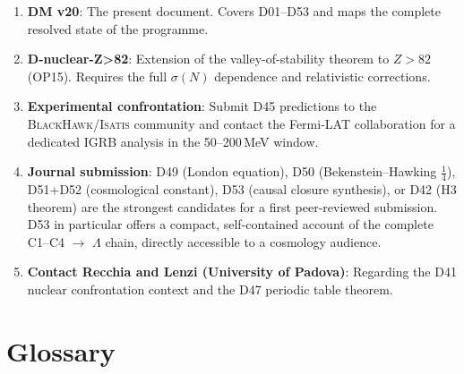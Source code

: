 \documentclass[11pt,a4paper]{article}
\theoremstyle{plain}
\theoremstyle{definition}
\theoremstyle{remark}
\newcommand{\sigmaN}{\sigma(N)}
\begin{document}
\begin{enumerate}
\item \textbf{DM v20}: The present document. Covers D01--D53 and maps the complete resolved state of the programme.
\item \textbf{D-nuclear-Z>82}: Extension of the valley-of-stability theorem to $Z>82$ (OP15). Requires the full $\sigmaN$ dependence and relativistic corrections.
\item \textbf{Experimental confrontation}: Submit D45 predictions to the \textsc{BlackHawk}/\textsc{Isatis} community and contact the Fermi-LAT collaboration for a dedicated IGRB analysis in the 50--200\,MeV window.
\item \textbf{Journal submission}: D49 (London equation), D50 (Bekenstein--Hawking $\tfrac{1}{4}$), D51+D52 (cosmological constant), D53 (causal closure synthesis), or D42 (H3 theorem) are the strongest candidates for a first peer-reviewed submission. D53 in particular offers a compact, self-contained account of the complete C1--C4 $\to$ $\Lambda$ chain, directly accessible to a cosmology audience.
\item \textbf{Contact Recchia and Lenzi (University of Padova)}: Regarding the D41 nuclear confrontation context and the D47 periodic table theorem.
\end{enumerate}

\section{Glossary}
\label{sec:glossary}
\end{document}
